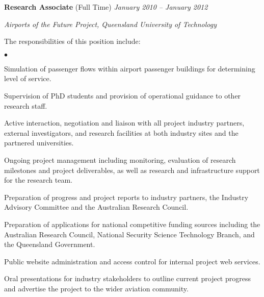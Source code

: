 \documentclass[margin,line]{resume}
\newenvironment{list1}{
  \begin{list}{}{%
      \setlength{\itemsep}{0in}
      \setlength{\parsep}{0in} \setlength{\parskip}{0in}
      \setlength{\topsep}{0in} \setlength{\partopsep}{0in}
      \setlength{\leftmargin}{0.17in}}}{\end{list}}
\newenvironment{list2}{
  \begin{list}{$\bullet$}{%
      \setlength{\itemsep}{0in}
      \setlength{\parsep}{0in} \setlength{\parskip}{0in}
      \setlength{\topsep}{0in} \setlength{\partopsep}{0in}
      \setlength{\leftmargin}{0.2in}}}{\end{list}}
\begin{document}
\begin{resume}
{\textbf{Research Associate} (Full Time)} \hfill {\it January 2010 -- January 2012}\\
\vspace{-0.85\baselineskip}
\begin{list1}
\item {\it Airports of the Future Project, Queensland University of Technology}
\item The responsibilities of this position include:
\begin{list2}
\item Simulation of passenger flows within airport passenger buildings for determining level of service.
\item Supervision of PhD students and provision of operational guidance to other research staff.
\item Active interaction, negotiation and liaison with all project industry partners, external investigators, and research facilities at both industry sites and the partnered universities.
\item Ongoing project management including monitoring, evaluation of research milestones and project deliverables, as well as research and infrastructure support for the research team.
\item Preparation of progress and project reports to industry partners, the Industry Advisory Committee and the Australian Research Council.
\item Preparation of applications for national competitive funding sources including the Australian Research Council, National Security Science Technology Branch, and the Queensland Government.
\item Public website administration and access control for internal project web services.
\item Oral presentations for industry stakeholders to outline current project progress and advertise the project to the wider aviation community.
\end{list2}
\end{list1}


\end{resume}
\end{document}
